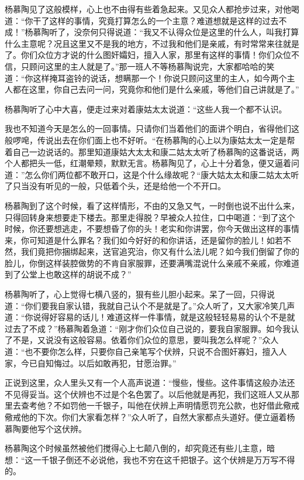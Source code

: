 \documentclass[12pt,UTF8]{ctexbook}
\begin{document}
{{{杨慕陶见了这般模样，心上也不由得有些着急起来。又见众人都抢步过来，对他喝道：“你干了这样的事情，究竟打算怎么的一个主意？难道想就是这样的过去不成！”杨慕陶听了，没奈何只得说道：“我又不认得众位是这里的什么人，叫我打算什么主意呢？况且这里又不是我的地方，不过我和他们是亲戚，有时常常来往就是了。你们众位方才说的什么图奸孀妇，擅入人家，那里有这样的事情！你们众位不信，只顾问这里的主人就是了。”那一班人不等杨慕陶说完，大家都哈哈的笑道：“你这样掩耳盗铃的说话，想瞒那一个！你说只顾问这里的主人，如今两个主人都在这里，你自己去问一问，究竟你和他们是什么亲戚，等他们自己讲就是了。”

杨慕陶听了心中大喜，便走过来对着康姑太太说道：“这些人我一个都不认识。

我也不知道今天是怎么的一回事情。只请你们当着他们的面讲个明白，省得他们这般啰唣，传说出去在你们面上也不好听。“在杨慕陶的心上以为康姑太太一定是帮着自己一边说话的。那里知道康姑大太太和康二姑太太听了杨慕陶的这番说话，两个人都把头一低，红潮晕颊，默默无言。杨慕陶见了，心上十分着急，便又逼着问道：”怎么你们两位都不敢开口，这是个什么缘故呢？“康大姑太太和康二姑太太听了只当没有听见的一般，只低着个头，还是给他一个不开口。

杨慕陶到了这个时候，看了这样情形，不由的又急又气，一时倒也说不出什么来，只得回转身来想要走下楼去。那里走得脱？早被众人拉住，口中喝道：“到了这个时候，你还要想逃走，不要想昏了你的头！老实和你讲罢，你今天做出这样的事情来，你可知道是什么罪名？我们如今好好的和你讲话，还是留你的脸儿！如若不然，我们竟把你捆绑起来，送官追究治，你又有什么法儿呢？如今我们倒留了你的脸儿，你倒这样装腔做势的不肯自家服罪，还要满嘴混说什么亲戚不亲戚，你难道到了公堂上也敢这样的胡说不成？”

杨慕陶听了，心上觉得七横八竖的，狠有些儿胆小起来。呆了一回，只得说道：“你们要我自家认错，我就自己认个不是就是了。”众人听了，又大家冷笑几声道：“你说得好容易的话儿！难道这样一件事情，就是这般轻轻易易的认个不是就过去了不成？”杨慕陶着急道：“刚才你们众位自己说的，要我自家服罪。如今我认了不是，又说没有这般容易。依着你们众位的意思，要叫我怎么样呢？”众人道：“也不要你怎么样，只要你自己亲笔写个伏辨，只说不合图奸寡妇，擅入人家，今已自知悔过。以后如敢再犯，甘愿治罪。”

正说到这里，众人里头又有一个人高声说道：“慢些，慢些。这件事情这般办法还不见得妥当。这个伏辨也不过是个名色罢了。以后他就是再犯，我们这班人又从那里去查考他？不如罚他一千银子，叫他在伏辨上声明情愿罚充公款，也好借此儆戒儆戒他的下次。你们大家看怎样？”众人听了，自然大家都点头道好。便立逼着杨慕陶要他写个这伏辨。

杨慕陶这个时候虽然被他们搅得心上七颠八倒的，却究竟还有些儿主意，暗想：“这一千银子倒还不必说他，我也不穷在这千把银子。这个伏辨是万万写不得的。

}}}
\end{document}
